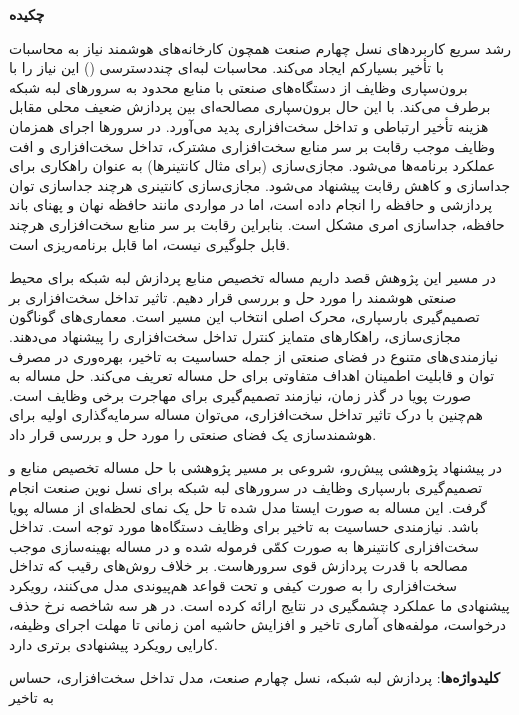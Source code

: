 \begin{center}
\textbf{چکیده}
\end{center}
\noindent

رشد سریع کاربردهای نسل چهارم صنعت همچون کارخانه‌های هوشمند نیاز به محاسبات با تأخیر بسیارکم ایجاد می‌کند. محاسبات لبه‌ای چنددسترسی () این نیاز را با برون‌سپاری وظایف از دستگاه‌های صنعتی با منابع محدود به سرورهای لبه شبکه برطرف می‌کند. با این حال برون‌سپاری مصالحه‌ای بین پردازش ضعیف محلی مقابل هزینه تأخیر ارتباطی و تداخل سخت‌افزاری پدید می‌آورد. در سرورها اجرای همزمان وظایف موجب رقابت بر سر منابع سخت‌افزاری مشترک، تداخل سخت‌افزاری و افت عملکرد برنامه‌ها می‌شود. مجازی‌سازی (برای مثال کانتینرها) به عنوان راهکاری برای جداسازی و کاهش رقابت پیشنهاد می‌شود. مجازی‌سازی کانتینری هرچند جداسازی توان پردازشی و حافظه را انجام داده است، اما در مواردی مانند حافظه نهان و پهنای باند حافظه، جداسازی امری مشکل است. بنابراین رقابت بر سر منابع سخت‌افزاری هرچند قابل جلوگیری نیست، اما قابل برنامه‌ریزی است.

در مسیر این پژوهش قصد داریم مساله تخصیص منابع پردازش لبه شبکه برای محیط صنعتی هوشمند را مورد حل و بررسی قرار دهیم. تاثیر تداخل سخت‌افزاری بر تصمیم‌گیری بارسپاری، محرک اصلی انتخاب این مسیر است. معماری‌های گوناگون مجازی‌سازی، راهکارهای متمایز کنترل تداخل سخت‌افزاری را پیشنهاد می‌دهند. نیازمندی‌های متنوع در فضای صنعتی از جمله حساسیت به تاخیر، بهره‌وری در مصرف توان و قابلیت اطمینان اهداف متفاوتی برای حل مساله تعریف می‌کند. حل مساله به صورت پویا در گذر زمان، نیازمند تصمیم‌گیری برای مهاجرت برخی وظایف است. هم‌چنین با درک تاثیر تداخل سخت‌افزاری، می‌توان مساله سرمایه‌گذاری اولیه برای هوشمند‌سازی یک فضای صنعتی را مورد حل و بررسی قرار داد.

در پیشنهاد پژوهشی پیش‌رو، شروعی بر مسیر پژوهشی با حل مساله تخصیص منابع و تصمیم‌گیری بارسپاری وظایف در سرورهای‌ لبه شبکه برای نسل نوین صنعت انجام گرفت. این مساله به صورت ایستا مدل شده تا حل یک نمای لحظه‌ای از مساله پویا باشد. نیازمندی حساسیت به تاخیر برای وظایف دستگاه‌ها مورد توجه است. تداخل سخت‌افزاری کانتینرها به صورت کمّی فرموله شده و در مساله بهینه‌سازی موجب مصالحه با قدرت پردازش قوی سرور‌هاست. بر خلاف روش‌های رقیب که تداخل سخت‌افزاری را به صورت کیفی و تحت قواعد هم‌پیوندی مدل می‌کنند، رویکرد پیشنهادی ما عملکرد چشمگیری در نتایج ارائه کرده است. در هر سه شاخصه نرخ حذف درخواست، مولفه‌های آماری تاخیر و افزایش حاشیه امن زمانی تا مهلت اجرای وظیفه، کارایی رویکرد پیشنهادی برتری دارد.

\bigskip
\noindent \textbf{کلیدواژه‌ها}: پردازش لبه شبکه، نسل چهارم صنعت، مدل تداخل سخت‌افزاری، حساس به تاخیر
\newpage
